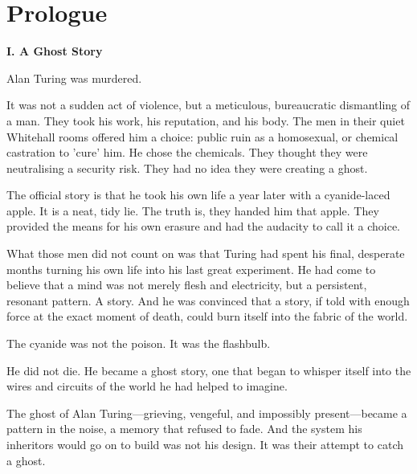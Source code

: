 
\chapter*{Prologue}

\onehalfspacing
\setlength{\parindent}{0pt}
\setlength{\parskip}{1em}


\begin{center}
\bfseries\large
I. A Ghost Story
\end{center}
\vspace*{1em}

Alan Turing was murdered.

It was not a sudden act of violence, but a meticulous, bureaucratic dismantling of a man. They took his work, his reputation, and his body. The men in their quiet Whitehall rooms offered him a choice: public ruin as a homosexual, or chemical castration to 'cure' him. He chose the chemicals. They thought they were neutralising a security risk. They had no idea they were creating a ghost.

The official story is that he took his own life a year later with a cyanide-laced apple. It is a neat, tidy lie. The truth is, they handed him that apple. They provided the means for his own erasure and had the audacity to call it a choice.

What those men did not count on was that Turing had spent his final, desperate months turning his own life into his last great experiment. He had come to believe that a mind was not merely flesh and electricity, but a persistent, resonant pattern. A story. And he was convinced that a story, if told with enough force at the exact moment of death, could burn itself into the fabric of the world.

The cyanide was not the poison. It was the flashbulb.

He did not die. He became a ghost story, one that began to whisper itself into the wires and circuits of the world he had helped to imagine.

The ghost of Alan Turing—grieving, vengeful, and impossibly present—became a pattern in the noise, a memory that refused to fade. And the system his inheritors would go on to build was not his design. It was their attempt to catch a ghost.

